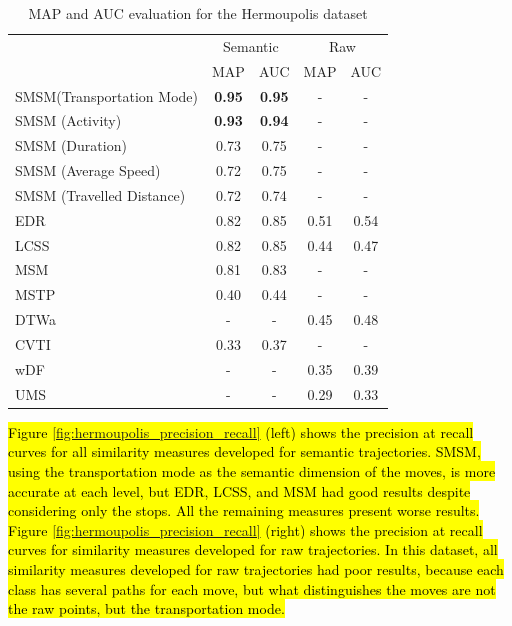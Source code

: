 \documentclass[12pt]{article}
\begin{document}
\begin{table}[h]
\scriptsize
  \centering
  \begin{tabular}{|l|c|c|c|c|}
  	\hline
 & \multicolumn{2}{c}{Semantic} & \multicolumn{2}{|c|}{Raw} \\
 	\cline{2-5}
 & MAP & AUC & MAP & AUC \\
  	\hline
SMSM(Transportation Mode)& \textbf{0.95} & \textbf{0.95} & - & -\\
SMSM (Activity)& \textbf{0.93} & \textbf{0.94} & - & -\\
SMSM (Duration)& 0.73 & 0.75 & - & -\\
SMSM (Average Speed)& 0.72 & 0.75 & - & -\\
SMSM (Travelled Distance)& 0.72 & 0.74 & - & -\\
EDR & 0.82 & 0.85 & 0.51 & 0.54 \\
LCSS & 0.82 & 0.85 & 0.44 & 0.47 \\
MSM & 0.81 & 0.83 & - & - \\
MSTP & 0.40 & 0.44 & - & - \\
DTWa & - & - & 0.45 & 0.48 \\
CVTI & 0.33 & 0.37 & - & - \\
wDF & - & - & 0.35 & 0.39 \\
UMS & - & - & 0.29 & 0.33 \\
    \hline
  \end{tabular}
  \caption{MAP and AUC evaluation for the Hermoupolis dataset}
  \label{tab:hermoupolis_measures_map_auc}
\end{table}

\hl{Figure {\ref{fig:hermoupolis_precision_recall}} (left) shows the precision at recall curves for all similarity measures developed for semantic trajectories. SMSM, using the transportation mode as the semantic dimension of the moves, is more accurate at each level, but EDR, LCSS, and MSM had   good results despite considering only the stops. All the remaining measures present worse results. Figure {\ref{fig:hermoupolis_precision_recall}} (right) shows the precision at recall curves for similarity measures developed for raw trajectories.  In this dataset, all similarity measures developed for raw trajectories had poor results, because each class has several paths for each move, but what distinguishes the moves are not the raw points, but the transportation mode.}
\end{document}
